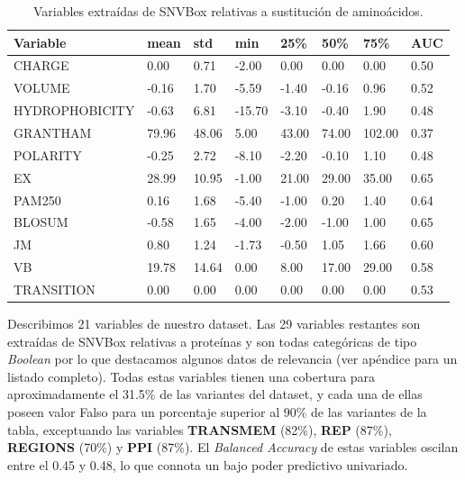 \begin{table}[H]
\centering
\begin{tabular}{|l|l|l|l|l|l|l|l|}
\hline
Variable & mean   & std    & min    & 25\%  & 50\%   & 75\%   & AUC    \\ \hline
CHARGE            & 0.00  & 0.71   & -2.00  & 0.00  & 0.00   & 0.00   & 0.50   \\ \hline
VOLUME            & -0.16  & 1.70   & -5.59  & -1.40 & -0.16  & 0.96   & 0.52   \\ \hline
HYDROPHOBICITY    & -0.63  & 6.81   & -15.70 & -3.10 & -0.40  & 1.90   & 0.48  \\ \hline
GRANTHAM          & 79.96  & 48.06  & 5.00   & 43.00 & 74.00  & 102.00 & 0.37 \\ \hline
POLARITY          & -0.25  & 2.72   & -8.10  & -2.20 & -0.10  & 1.10   & 0.48   \\ \hline
EX                & 28.99  & 10.95  & -1.00  & 21.00 & 29.00  & 35.00  & 0.65  \\ \hline
PAM250            & 0.16   & 1.68   & -5.40  & -1.00 & 0.20   & 1.40   & 0.64   \\ \hline
BLOSUM            & -0.58  & 1.65   & -4.00  & -2.00 & -1.00  & 1.00   & 0.65   \\ \hline
JM                & 0.80   & 1.24   & -1.73  & -0.50 & 1.05   & 1.66   & 0.60   \\ \hline
VB                & 19.78  & 14.64  & 0.00   & 8.00  & 17.00  & 29.00  & 0.58  \\ \hline
TRANSITION        & 0.00   & 0.00   & 0.00   & 0.00  & 0.00   & 0.00   & 0.53   \\ \hline
\end{tabular}
\caption{Variables extraídas de SNVBox relativas a sustitución de aminoácidos.}
\label{tab:snvbox_amino}

\end{table}

Describimos 21 variables de nuestro dataset. Las 29 variables restantes son extraídas de SNVBox relativas a proteínas y son todas categóricas de tipo \textit{Boolean} por lo que destacamos algunos datos de relevancia (ver apéndice para un listado completo). Todas estas variables tienen una cobertura para aproximadamente el 31.5\% de las variantes del dataset, y cada una de ellas poseen valor Falso para un porcentaje superior al 90\% de las variantes de la tabla, exceptuando las variables \textbf{TRANSMEM} (82\%), \textbf{REP} (87\%), \textbf{REGIONS} (70\%) y \textbf{PPI} (87\%). El \textit{Balanced Accuracy} de estas variables oscilan entre el 0.45 y 0.48, lo que connota un bajo poder predictivo univariado.


